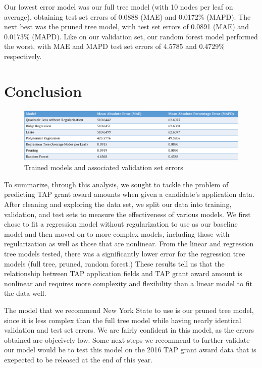 \documentclass[12pt, fleqn]{article}
\begin{document}
Our lowest error model was our full tree model (with 10 nodes per leaf on average), obtaining test set errors of 0.0888 (MAE) and 0.0172\% (MAPD). The next best was the pruned tree model, with test set errors of 0.0891 (MAE) and 0.0173\% (MAPD). Like on our validation set, our random forest model performed the worst, with MAE and MAPD test set errors of 4.5785 and 0.4729\% respectively.

\section{Conclusion}
\begin{figure}
	\includegraphics[scale = 0.5]{Errors.png}
	\caption{Trained models and associated validation set errors}
\end{figure}


To summarize, through this analysis, we sought to tackle the problem of predicting TAP grant award amounts when given a candidate's application data. After cleaning and exploring the data set, we split our data into training, validation, and test sets to measure the effectiveness of various models. We first chose to fit a regression model without regularization to use as our baseline model and then moved on to more complex models, including those with regularization as well as those that are nonlinear. From the linear and regression tree models tested, there was a significantly lower error for the regression tree models (full tree, pruned, random forest.) These results tell us that the relationship between TAP application fields and TAP grant award amount is nonlinear and requires more complexity and flexibility than a linear model to fit the data well. 

The model that we recommend New York State to use is our pruned tree model, since it is less complex than the full tree model while having nearly identical validation and test set errors. We are fairly confident in this model, as the errors obtained are objecively low. Some next steps we recommend to further validate our model would be to test this model on the 2016 TAP grant award data that is exepected to be released at the end of this year.
\end{document}

